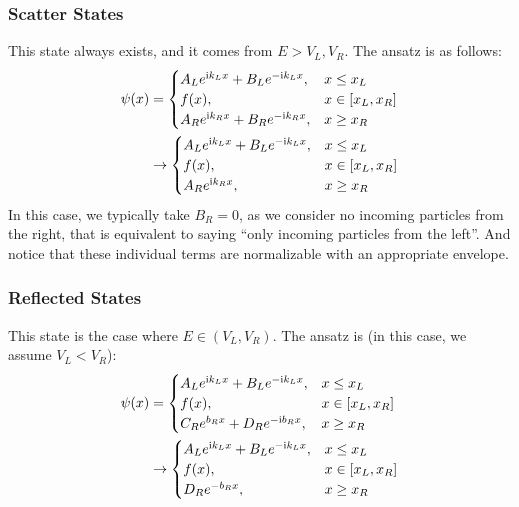 \subsubsection{Scatter States}
This state always exists, and it comes from $E > V_L, V_R$. The ansatz is as follows:
\begin{align*}
    \psi(x) &= \begin{cases}
        A_L e^{\mathrm{i} k_L x} + B_L e^{-\mathrm{i} k_L x}, & x \le x_L \\
        f(x), & x \in [x_L, x_R] \\
        A_R e^{\mathrm{i} k_R x} + B_R e^{-\mathrm{i} k_R x}, & x \ge x_R
    \end{cases} \\
    &\to \begin{cases}
        A_L e^{\mathrm{i} k_L x} + B_L e^{-\mathrm{i} k_L x}, & x \le x_L \\
        f(x), & x \in [x_L, x_R] \\
        A_R e^{\mathrm{i} k_R x}, & x \ge x_R
    \end{cases}
\end{align*}
In this case, we typically take $B_R = 0$, as we consider no incoming particles from the right, that is equivalent to saying ``only incoming particles from the left''. And notice that these individual terms are normalizable with an appropriate envelope.

\subsubsection{Reflected States}
This state is the case where $E \in (V_L, V_R)$. The ansatz is (in this case, we assume $V_L < V_R$):
\begin{align*}
    \psi(x) &= \begin{cases}
        A_L e^{\mathrm{i} k_L x} + B_L e^{-\mathrm{i} k_L x}, & x \le x_L \\
        f(x), & x \in [x_L, x_R] \\
        C_R e^{b_R x} + D_R e^{-\mathrm{i} b_R x}, & x \ge x_R
    \end{cases} \\
    &\to \begin{cases}
        A_L e^{\mathrm{i} k_L x} + B_L e^{-\mathrm{i} k_L x}, & x \le x_L \\
        f(x), & x \in [x_L, x_R] \\
        D_R e^{-b_R x}, & x \ge x_R
    \end{cases}
\end{align*}

